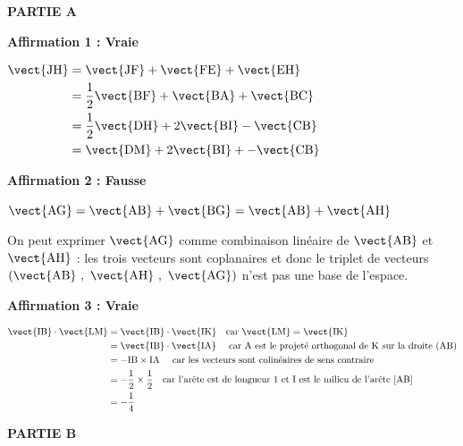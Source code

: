 
\medskip

\textbf{PARTIE A}

\medskip

\textbf{Affirmation 1 : Vraie }

\smallskip

$\begin{aligned}\vect{\text{JH}} & = \vect{\text{JF}} +\vect{\text{FE}} +\vect{\text{EH}}\\
  & = \dfrac{1}{2}\vect{\text{BF}}+ \vect{\text{BA}}+\vect{\text{BC}}\\
  &=   \dfrac{1}{2}\vect{\text{DH}}+ 2\vect{\text{BI}}-\vect{\text{CB}}\\
  &  =\vect{\text{DM}}  + 2\vect{\text{BI}} + - \vect{\text{CB}}
  	\end{aligned}$

\textbf{Affirmation 2 : Fausse }

\smallskip

$\vect{\text{AG}}=\vect{\text{AB}}+\vect{\text{BG}} = \vect{\text{AB}}+\vect{\text{AH}}$

On peut exprimer $\vect{\mathrm{AG}}$ comme combinaison linéaire de $\vect{\mathrm{AB}}$ et $\vect{\mathrm{AH}}$ : les trois vecteurs sont coplanaires et donc le triplet de vecteurs $\left(\vect{\text{AB}}~,~\vect{\text{AH}}~,~ \vect{\text{AG}}\right)$ n'est pas  une base de l'espace.

\textbf{Affirmation 3 : Vraie}

\smallskip

$\begin{aligned}
	\vect{\text{IB}} \cdot \vect{\text{LM}} &= \vect{\text{IB}} \cdot \vect{\text{IK}}\quad \text{car }\vect{\mathrm{LM}} = \vect{\mathrm{IK}}\\
	&= \vect{\text{IB}} \cdot \vect{\text{IA}}\quad \text{ car A est le projeté orthogonal de K sur la droite (AB)}\\
	&= -{\text{IB}} \times {\text{IA}} \quad\text{ car les vecteurs sont colinéaires de sens contraire}\\
	&= - \dfrac 12 \times \dfrac 12 \quad\text{car l'arête est de longueur 1 et I est le milieu de l'arête [AB]}\\
	&= -\dfrac 14
\end{aligned}$

\bigskip

\textbf{PARTIE B}

\medskip

%

